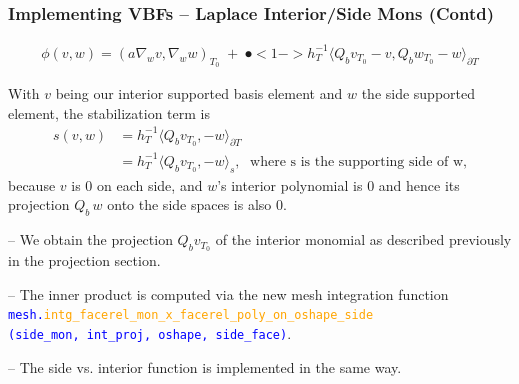 \documentclass[compress]{beamer}
\begin{document}
\begin{frame}
  \frametitle{Implementing VBFs -- Laplace Interior/Side Mons (Contd)}
  \vspace{-.5cm}
  \begin{align*}
    \mathfrak \phi(v,w) = (a \nabla_w v,\nabla_w w)_{\scriptscriptstyle T_0} \;+\;
    \spot<1->{h_T^{-1}\langle Q_b v_{\scriptscriptstyle T_0} - v,Q_b w_{\scriptscriptstyle T_0} - w \rangle_{\partial T}}
  \end{align*}

   {
    With $v$ being our interior supported basis element and $w$ the side supported element, the stabilization term is
    \begin{align*}
      s(v,w) &= h_T^{-1} \langle Q_b v_{\scriptscriptstyle T_0}, -w \rangle_{\partial T}\\
             &= h_T^{-1} \langle Q_b v_{\scriptscriptstyle T_0}, -w \rangle_{s}, \; \text{ where s is the supporting side of w,}
    \end{align*}
   because $v$ is $0$ on each side, and $w$'s interior polynomial is $0$ and hence its projection $Q_b\,w$ onto the side spaces
   is also $0$.\\

  \vspace{0.1cm}
   {
  -- We obtain the projection $Q_b v_{\scriptscriptstyle T_0}$ of the interior monomial as described previously in the projection section.

  \vspace{0.1cm}
   {
  -- The inner product is computed via the new mesh integration function 
  \texttt{\small \textcolor{blue}{mesh.\textcolor{orange}{intg\_facerel\_mon\_x\_facerel\_poly\_on\_oshape\_side}\\
  \vspace{-.1cm}\hspace{1cm}(side\_mon, int\_proj, oshape, side\_face)}}.

  \vspace{0.1cm}
   {
  -- The side vs. interior function is implemented in the same way.
  }}}}
\end{frame}
\end{document}
